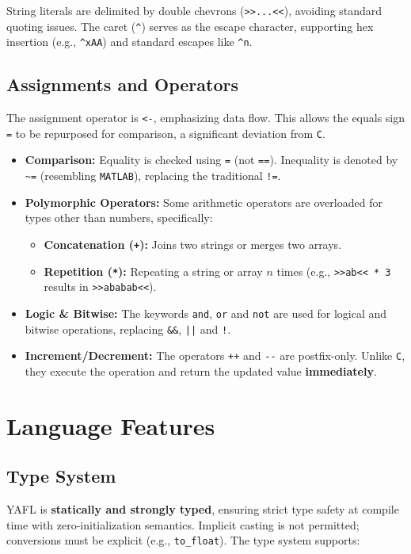 \documentclass[11pt,a4paper]{article}
\begin{document}
String literals are delimited by double chevrons (\texttt{>>...<<}), avoiding standard quoting issues. The caret (\texttt{\^{}}) serves as the escape character, supporting hex insertion (e.g., \texttt{\^{}xAA}) and standard escapes like \texttt{\^{}n}.

\subsection{Assignments and Operators}
The assignment operator is \texttt{<-}, emphasizing data flow. This allows the equals sign \texttt{=} to be repurposed for comparison, a significant deviation from \texttt{C}.
\begin{itemize}
    \item \textbf{Comparison:} Equality is checked using \texttt{=} (not \texttt{==}). Inequality is denoted by \texttt{\textasciitilde=} (resembling \texttt{MATLAB}), replacing the traditional \texttt{!=}.
    \item \textbf{Polymorphic Operators:} Some arithmetic operators are overloaded for types other than numbers, specifically:
    \begin{itemize}
        \item \textbf{Concatenation (\texttt{+}):} Joins two strings or merges two arrays.
        \item \textbf{Repetition (\texttt{*}):} Repeating a string or array $n$ times (e.g., \texttt{>>ab<< * 3} results in \texttt{>>ababab<<}).
    \end{itemize}
    \item \textbf{Logic \& Bitwise:} The keywords \texttt{and}, \texttt{or} and \texttt{not} are used for logical and bitwise operations, replacing \texttt{\&\&}, \texttt{||} and \texttt{!}.
    \item \textbf{Increment/Decrement:} The operators \texttt{++} and \texttt{-}\texttt{-} are postfix-only. Unlike \texttt{C}, they execute the operation and return the updated value \textbf{immediately}.
\end{itemize}

\section{Language Features}

\subsection{Type System}
YAFL is \textbf{statically and strongly typed}, ensuring strict type safety at compile time with zero-initialization semantics.
Implicit casting is not permitted; conversions must be explicit (e.g., \texttt{to\_float}).
The type system supports:
\end{document}
